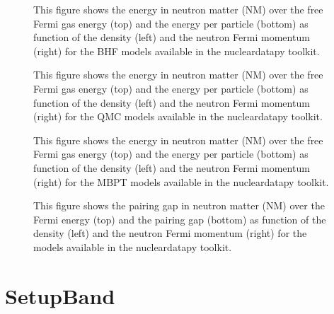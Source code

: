 \documentclass[letterpaper,10pt,english]{sphinxmanual}
\begin{document}
\begin{figure}[htbp]
\centering
\capstart

\noindent{}
\caption{This figure shows the energy in neutron matter (NM) over the free Fermi gas energy (top) and the energy per particle (bottom) as function of the density (left) and the neutron Fermi momentum (right) for the BHF models available in the nucleardatapy toolkit.}\label{\detokenize{source/api/setup_micro:id2}}\end{figure}

\begin{figure}[htbp]
\centering
\capstart

\noindent{}
\caption{This figure shows the energy in neutron matter (NM) over the free Fermi gas energy (top) and the energy per particle (bottom) as function of the density (left) and the neutron Fermi momentum (right) for the QMC models available in the nucleardatapy toolkit.}\label{\detokenize{source/api/setup_micro:id3}}\end{figure}

\begin{figure}[htbp]
\centering
\capstart

\noindent{}
\caption{This figure shows the energy in neutron matter (NM) over the free Fermi gas energy (top) and the energy per particle (bottom) as function of the density (left) and the neutron Fermi momentum (right) for the MBPT models available in the nucleardatapy toolkit.}\label{\detokenize{source/api/setup_micro:id4}}\end{figure}

\begin{figure}[htbp]
\centering
\capstart

\noindent{}
\caption{This figure shows the pairing gap in neutron matter (NM) over the Fermi energy (top) and the pairing gap (bottom) as function of the density (left) and the neutron Fermi momentum (right) for the models available in the nucleardatapy toolkit.}\label{\detokenize{source/api/setup_micro:id5}}\end{figure}

\sphinxstepscope


\section{SetupBand}
\label{\detokenize{source/api/setup_band:setupband}}\label{\detokenize{source/api/setup_band::doc}}\label{\detokenize{source/api/setup_band:module-nucleardatapy.setup_band}}
\end{document}
